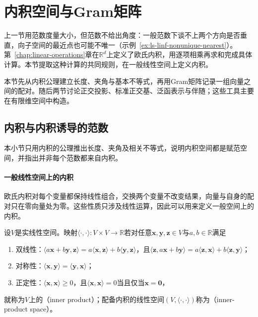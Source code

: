 
\section{内积空间与Gram矩阵}
\label{sec:ls-inner-product-spaces}

上一节用范数度量大小，但范数不给出角度：一般范数下谈不上两个方向是否垂直，向子空间的最近点也可能不唯一（示例~\ref{ex:ls-linf-nonunique-nearest}）。第~\ref{chap:linear-operations}章在$\mathbb R^d$上定义了欧氏内积，用逐项相乘再求和完成具体计算。本节提取这种计算的共同规则，在一般线性空间上定义内积。

本节先从内积公理建立长度、夹角与基本不等式，再用Gram矩阵记录一组向量之间的配对。随后两节讨论正交投影、标准正交基、泛函表示与伴随；这些工具主要在有限维空间中构造。

\subsection{内积与内积诱导的范数}
\label{sec:ls-inner-product-definition}

本小节只用内积的公理推出长度、夹角及相关不等式，说明内积空间都是赋范空间，并指出并非每个范数都来自内积。

\paragraph{一般线性空间上的内积}
欧氏内积对每个变量都保持线性组合，交换两个变量不改变结果，向量与自身的配对只在零向量处为零。这些性质只涉及线性运算，因此可以用来定义一般空间上的内积。
\begin{definition}[内积空间]
\label{def:functional-inner-product-space}
\label{def:linear-algebra-inner-product}
设$V$是实线性空间。映射$\langle\cdot,\cdot\rangle:V\times V\to\mathbb R$若对任意$\bm x,\bm y,\bm z\in V$与$a,b\in\mathbb R$满足
\begin{enumerate}
 \item 双线性：$\langle a\bm x+b\bm y,\bm z\rangle=a\langle\bm x,\bm z\rangle+b\langle\bm y,\bm z\rangle$，且$\langle\bm z,a\bm x+b\bm y\rangle=a\langle\bm z,\bm x\rangle+b\langle\bm z,\bm y\rangle$；
 \item 对称性：$\langle\bm x,\bm y\rangle=\langle\bm y,\bm x\rangle$；
 \item 正定性：$\langle\bm x,\bm x\rangle\geq0$，且$\langle\bm x,\bm x\rangle=0$当且仅当$\bm x=\bm0$，
\end{enumerate}
就称为$V$上的（inner product）；配备内积的线性空间$(V,\langle\cdot,\cdot\rangle)$称为（inner-product space）。
\end{definition}
